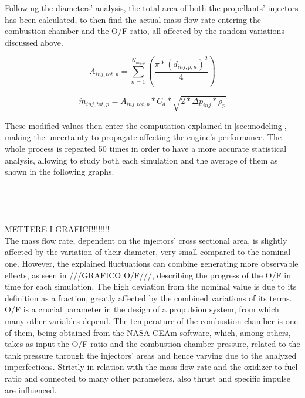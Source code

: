 Following the diameters' analysis, the total area of both the propellants' injectors has been calculated, to then find the actual mass flow rate entering the combustion chamber and the O/F ratio, all affected by the random variations discussed above. 


\begin{equation}
	A_{inj,tot,p} = \sum_{n=1}^{N_{inj,p}} \left(\frac{\pi*(d_{inj,p,n})^2}{4} \right)
    \label{eq:totalarea}
\end{equation}

\begin{equation}
    \dot m_{inj,tot,p} = A_{inj,tot,p} * C_d*\sqrt{2*\Delta p_{inj}*\rho_p}
    \label{eq:massflow}
\end{equation}

These modified values then enter the computation explained in \autoref{sec:modeling}, making the uncertainty to propagate affecting the engine's performance. The whole process is repeated 50 times in order to have a more accurate statistical analysis, allowing to study both each simulation and the average of them as shown in the following graphs.
\\
\\
\\
\\
\\


METTERE I GRAFICI!!!!!!!!\\


The mass flow rate, dependent on the injectors' cross sectional area, is slightly affected by the variation of their diameter, very small compared to the nominal one. However, the explained fluctuations can combine generating more observable effects, as seen in ///GRAFICO O/F///, describing the progress of the O/F in time for each simulation. The high deviation from the nominal value is due to its definition as a fraction, greatly affected by the combined variations of its terms. O/F is a crucial parameter in the design of a propulsion system, from which many other variables depend. The temperature of the combustion chamber is one of them, being obtained from the NASA-CEAm software, which, among others, takes as input the O/F ratio and the combustion chamber pressure, related to the tank pressure through the injectors' areas and hence varying due to the analyzed imperfections. Strictly in relation with the mass flow rate and the oxidizer to fuel ratio and connected to many other parameters, also thrust and specific impulse are influenced.

